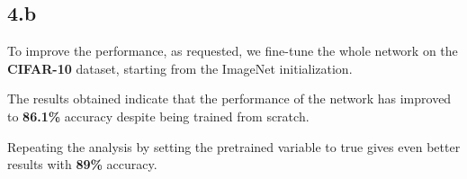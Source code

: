 \documentclass{article}
\begin{document}
\begin{figure}[!h]
	\begin{center}
		\hspace{1mm}
	\end{center}
	\captionsetup{justification=raggedright,margin=1cm}
	\label{gr}
\end{figure}
\subsection*{4.b}
To improve the performance, as requested, we fine-tune the whole network on the \textbf{CIFAR-10} dataset, starting from the ImageNet initialization. 
\begin{figure}[!h]
	\begin{center}
		\hspace{1mm}
	\end{center}
	\captionsetup{justification=raggedright,margin=1cm}
	\label{gr}
\end{figure}

The results obtained indicate that the performance of the network has improved to \textbf{86.1\%} accuracy despite being trained from scratch. 
\begin{figure}[!h]
	\begin{center}
		\hspace{1mm}
	\end{center}
	\captionsetup{justification=raggedright,margin=1cm}
	\label{gr}
\end{figure}

Repeating the analysis by setting the pretrained variable to true gives even better results with \textbf{89\%} accuracy.


\newpage
\end{document}
